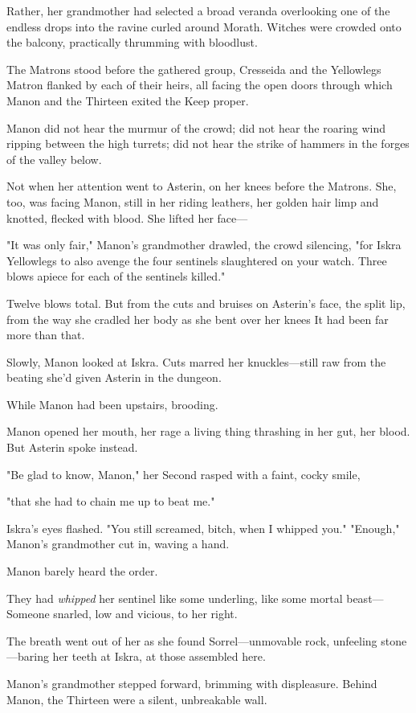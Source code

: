 Rather, her grandmother had selected a broad veranda overlooking one of the endless drops into the ravine curled around Morath.
Witches were crowded onto the balcony, practically thrumming with bloodlust.

The Matrons stood before the gathered group, Cresseida and the Yellowlegs Matron flanked by each of their heirs, all facing the open doors through which Manon and the Thirteen exited the Keep proper.

Manon did not hear the murmur of the crowd; did not hear the roaring wind ripping between the high turrets; did not hear the strike of hammers in the forges of the valley below.

Not when her attention went to Asterin, on her knees before the Matrons.
She, too, was facing Manon, still in her riding leathers, her golden hair limp and knotted, flecked with blood.
She lifted her face---

"It was only fair," Manon's grandmother drawled, the crowd silencing, "for Iskra Yellowlegs to also avenge the four sentinels slaughtered on your watch.
Three blows apiece for each of the sentinels killed."

Twelve blows total.
But from the cuts and bruises on Asterin's face, the split lip, from the way she cradled her body as she bent over her knees  It had been far more than that.

Slowly, Manon looked at Iskra.
Cuts marred her knuckles---still raw from the beating she'd given Asterin in the dungeon.

While Manon had been upstairs, brooding.

Manon opened her mouth, her rage a living thing thrashing in her gut, her blood.
But Asterin spoke instead.

"Be glad to know, Manon," her Second rasped with a faint, cocky smile,

"that she had to chain me up to beat me."

Iskra's eyes flashed.
"You still screamed, bitch, when I whipped you."
"Enough," Manon's grandmother cut in, waving a hand.

Manon barely heard the order.

They had \emph{whipped} her sentinel like some underling, like some mortal beast--- Someone snarled, low and vicious, to her right.

The breath went out of her as she found Sorrel---unmovable rock, unfeeling stone---baring her teeth at Iskra, at those assembled here.

Manon's grandmother stepped forward, brimming with displeasure.
Behind Manon, the Thirteen were a silent, unbreakable wall.

